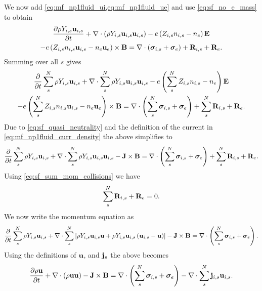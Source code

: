 \documentclass[a4paper,11pt]{report}
\begin{document}
We now add \cref{eq:mf_np1fluid_ui,eq:mf_np1fluid_ue} and use \cref{eq:sf_no_e_mass} to obtain
\begin{multline*}
    \frac{\partial \rho Y_{i,s} \mathbf{u}_{i,s}}{\partial t} + \nabla \cdot \left( \rho Y_{i,s} \mathbf{u}_{i,s} \mathbf{u}_{i,s} \right) -e \left( Z_{i,s} n_{i,s} - n_e \right) \mathbf{E} \\
    - e \left( Z_{i,s} n_{i,s} \mathbf{u}_{i,s} - n_e \mathbf{u}_e \right) \times \mathbf{B} = \nabla \cdot \left( \bm \sigma_{i,s} + \bm \sigma_e \right) + \mathbf{R}_{i,s} + \mathbf{R}_e.
\end{multline*}
Summing over all $s$ gives
\begin{multline*}
    \frac{\partial}{\partial t} \sum_s^N \rho Y_{i,s} \mathbf{u}_{i,s} + \nabla \cdot \sum_s^N \rho Y_{i,s} \mathbf{u}_{i,s} \mathbf{u}_{i,s} - e \left( \sum_s^N Z_{i,s} n_{i,s} - n_e \right) \mathbf{E} \\
    - e \left( \sum_s^N Z_{i,s} n_{i,s} \mathbf{u}_{i,s} - n_e \mathbf{u}_e \right) \times \mathbf{B} = \nabla \cdot \left( \sum_s^N \bm \sigma_{i,s} + \bm \sigma_e \right) + \sum_s^N \mathbf{R}_{i,s} + \mathbf{R}_e.
\end{multline*}
Due to \cref{eq:sf_quasi_neutrality} and the definition of the current in \cref{eq:mf_np1fluid_curr_density} the above simplifies to
\begin{equation*}
    \frac{\partial}{\partial t} \sum_s^N \rho Y_{i,s} \mathbf{u}_{i,s} + \nabla \cdot \sum_s^N \rho Y_{i,s} \mathbf{u}_{i,s} \mathbf{u}_{i,s} - \mathbf{J} \times \mathbf{B} = \nabla \cdot \left( \sum_s^N \bm \sigma_{i,s} + \bm \sigma_e \right) + \sum_s^N \mathbf{R}_{i,s} + \mathbf{R}_e.
\end{equation*}
Using \cref{eq:sf_sum_mom_collisions} we have
\begin{equation}
    \sum_s^N \mathbf{R}_{i,s} + \mathbf{R}_e = 0.
\end{equation}
We now write the momentum equation as
\begin{equation*}
    \frac{\partial}{\partial t} \sum_s^N \rho Y_{i,s} \mathbf{u}_{i,s} + \nabla \cdot \sum_s^N \left[ \rho Y_{i,s} \mathbf{u}_{i,s} \mathbf{u} + \rho Y_{i,s} \mathbf{u}_{i,s} \left( \mathbf{u}_{i,s} - \mathbf{u} \right) \right] - \mathbf{J} \times \mathbf{B} = \nabla \cdot \left( \sum_s^N \bm \sigma_{i,s} + \bm \sigma_e \right).
\end{equation*}
Using the definitions of $\mathbf{u}$, and $\mathbf{j}_s$ the above becomes
\begin{equation}
    \frac{\partial \rho \mathbf{u}}{\partial t} + \nabla \cdot \left( \rho \mathbf{u} \mathbf{u} \right) - \mathbf{J} \times \mathbf{B} = \nabla \cdot \left( \sum_s^N \bm \sigma_{i,s} + \bm \sigma_e \right) - \nabla \cdot \sum_s^N \mathbf{j}_{i,s} \mathbf{u}_{i,s}.
\end{equation}
\end{document}
